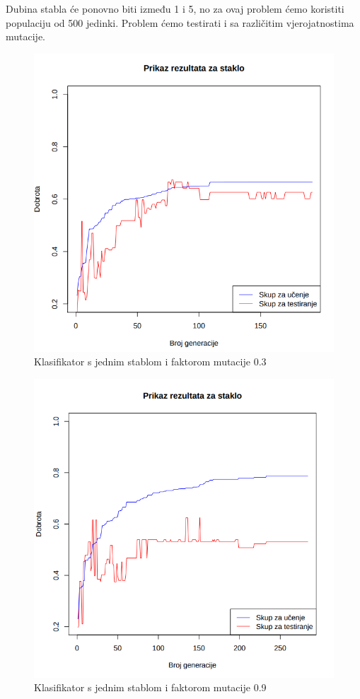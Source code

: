 \documentclass[times, utf8, zavrsni]{fer}
\begin{document}
Dubina stabla će ponovno biti između 1 i 5, no za ovaj problem ćemo koristiti populaciju od 500 jedinki. Problem ćemo testirati i sa različitim vjerojatnostima mutacije.

\begin{figure}[H]
\centering
\includegraphics[scale=0.45]{grafovi/staklo1-3}
\caption{Klasifikator s jednim stablom i faktorom mutacije 0.3}
\end{figure}


\begin{figure}[htb]
\centering
\includegraphics[scale=0.45]{grafovi/staklo1-9}
\caption{Klasifikator s jednim stablom i faktorom mutacije 0.9}
\end{figure}
\end{document}

